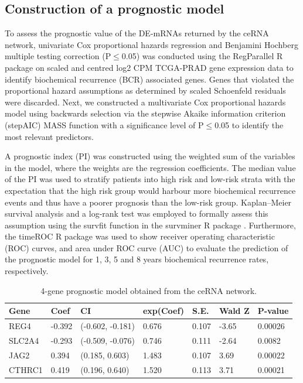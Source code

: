 \documentclass[twocolumn]{bmcart}%
\begin{document}
\subsection*{\textbf{Construction of a prognostic model}}
To assess the prognostic value of the DE-mRNAs returned by the ceRNA network, univariate Cox proportional hazards regression and Benjamini Hochberg multiple testing correction (P$\le$0.05) was conducted using the RegParallel R package \cite{regparallel} on scaled and centred log2 CPM TCGA-PRAD gene expression data to identify biochemical recurrence (BCR) associated genes. Genes that violated the proportional hazard assumptions as determined by scaled Schoenfeld residuals \cite{Schoenfeld1982Apr} were discarded. Next, we constructed a multivariate Cox proportional hazards model using backwards selection via the stepwise Akaike information criterion (stepAIC) MASS function \cite{MASS} with a significance level of P$\le$0.05 to identify the most relevant predictors. \par
A prognostic index (PI) was constructed using the weighted sum of the variables in the model, where the weights are the regression coefficients. The median value of the PI was used to stratify patients into high risk and low-risk strata with the expectation that the high risk group would harbour more biochemical recurrence events and thus have a poorer prognosis than the low-risk group. Kaplan–Meier survival analysis and a log-rank test was employed to formally assess this assumption using the survfit function in the survminer R package \cite{survminer}. Furthermore, the timeROC R package \cite{timeroc} was used to show receiver operating characteristic (ROC) curves, and area under ROC curve (AUC) to evaluate the prediction of the prognostic model for 1, 3, 5 and 8 years biochemical recurrence rates, respectively.

\begin{table}[ht!]
\caption{4-gene prognostic model obtained from the ceRNA network.}
\begin{tabular}{lllllll}
\toprule
\textbf{Gene} & \textbf{Coef} & \textbf{CI} & \textbf{exp(Coef)} & \textbf{S.E.} & \textbf{Wald Z} & \textbf{P-value}
\\
\toprule
REG4 & -0.392 & (-0.602, -0.181) & 0.676 & 0.107 & -3.65 & 0.00026
\\
SLC2A4 & -0.293 & (-0.509, -0.076) & 0.746 & 0.111 & -2.64 & 0.0082
\\
JAG2 & 0.394 & (0.185, 0.603) & 1.483 & 0.107 & 3.69 & 0.00022
\\
CTHRC1 & 0.419 & (0.196, 0.640) & 1.520 & 0.113 & 3.71 & 0.00021 
\\
\toprule
\end{tabular}
\label{tab:genes_coxph_bcr}
\end{table}
\end{document}
